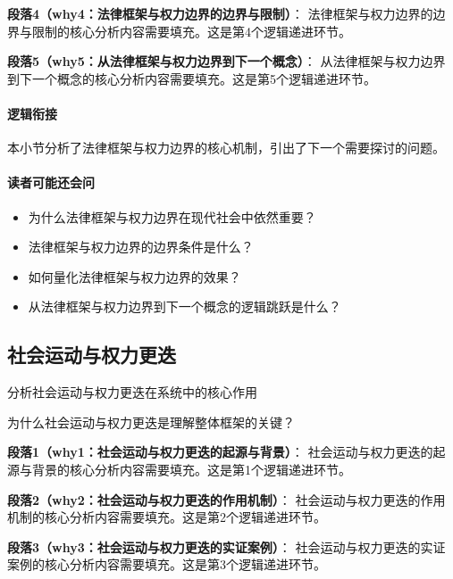 \documentclass[../main.tex]{subfiles}
\begin{document}
\textbf{段落4（why4：法律框架与权力边界的边界与限制）}：
法律框架与权力边界的边界与限制的核心分析内容需要填充。这是第4个逻辑递进环节。


\textbf{段落5（why5：从法律框架与权力边界到下一个概念）}：
从法律框架与权力边界到下一个概念的核心分析内容需要填充。这是第5个逻辑递进环节。


\paragraph*{逻辑衔接}
本小节分析了法律框架与权力边界的核心机制，引出了下一个需要探讨的问题。

\paragraph*{读者可能还会问}
\begin{itemize}
\item 为什么法律框架与权力边界在现代社会中依然重要？
\item 法律框架与权力边界的边界条件是什么？
\item 如何量化法律框架与权力边界的效果？
\item 从法律框架与权力边界到下一个概念的逻辑跳跃是什么？
\end{itemize}


\subsection{社会运动与权力更迭}

\begin{motivation}
分析社会运动与权力更迭在系统中的核心作用
\end{motivation}

\begin{logicmap}
[逻辑链占位]
\end{logicmap}

\begin{questionbox}
为什么社会运动与权力更迭是理解整体框架的关键？
\end{questionbox}

\textbf{段落1（why1：社会运动与权力更迭的起源与背景）}：
社会运动与权力更迭的起源与背景的核心分析内容需要填充。这是第1个逻辑递进环节。


\textbf{段落2（why2：社会运动与权力更迭的作用机制）}：
社会运动与权力更迭的作用机制的核心分析内容需要填充。这是第2个逻辑递进环节。


\textbf{段落3（why3：社会运动与权力更迭的实证案例）}：
社会运动与权力更迭的实证案例的核心分析内容需要填充。这是第3个逻辑递进环节。
\end{document}
